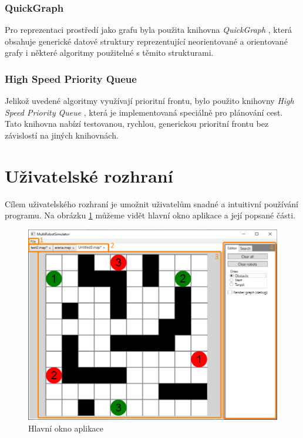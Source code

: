 \subsubsection{QuickGraph}
Pro reprezentaci prostředí jako grafu byla použita knihovna \emph{QuickGraph} \cite{QuickGraph}, která obsahuje generické datové struktury reprezentující neorientované a orientované grafy i některé algoritmy použitelné s těmito strukturami.

\subsubsection{High Speed Priority Queue}
Jelikož uvedené algoritmy využívají prioritní frontu, bylo použito knihovny \emph{High Speed Priority Queue} \cite{HSPQ}, která je implementovaná speciálně pro plánování cest. Tato knihovna nabízí testovanou, rychlou, generickou prioritní frontu bez závislostí na jiných knihovnách.

\section{Uživatelské rozhraní}
Cílem uživatelského rozhraní je umožnit uživatelům snadné a intuitivní používání programu. Na obrázku \ref{obr:gui} můžeme vidět hlavní okno aplikace a její popsané části.

\begin{figure}[htb]
	\begin{center}
		\includegraphics*[width=\textwidth,keepaspectratio]{obr/gui}
	\end{center}
	\caption[caption]{Hlavní okno aplikace}
	\label{obr:gui}
\end{figure}

